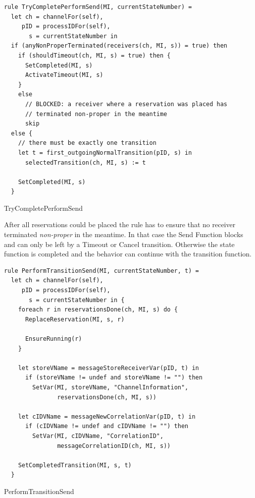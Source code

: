 \begin{listing}[htbp]
\begin{verbatim}
rule TryCompletePerformSend(MI, currentStateNumber) =
  let ch = channelFor(self),
     pID = processIDFor(self),
       s = currentStateNumber in
  if (anyNonProperTerminated(receivers(ch, MI, s)) = true) then
    if (shouldTimeout(ch, MI, s) = true) then {
      SetCompleted(MI, s)
      ActivateTimeout(MI, s)
    }
    else
      // BLOCKED: a receiver where a reservation was placed has
      // terminated non-proper in the meantime
      skip
  else {
    // there must be exactly one transition
    let t = first_outgoingNormalTransition(pID, s) in
      selectedTransition(ch, MI, s) := t

    SetCompleted(MI, s)
  }
\end{verbatim}
\caption{TryCompletePerformSend}
\label{lst:shortasm:TryCompletePerformSend}
\end{listing}


After all reservations could be placed the 
rule has to ensure that no receiver terminated \textit{non-proper} in the
meantime. In that case the Send Function blocks and can only be left by a
Timeout or Cancel transition. Otherwise the state function is completed and the behavior can
continue with the transition function.


\begin{listing}[htbp]
\begin{verbatim}
rule PerformTransitionSend(MI, currentStateNumber, t) =
  let ch = channelFor(self),
     pID = processIDFor(self),
       s = currentStateNumber in {
    foreach r in reservationsDone(ch, MI, s) do {
      ReplaceReservation(MI, s, r)

      EnsureRunning(r)
    }

    let storeVName = messageStoreReceiverVar(pID, t) in
      if (storeVName != undef and storeVName != "") then
        SetVar(MI, storeVName, "ChannelInformation",
               reservationsDone(ch, MI, s))

    let cIDVName = messageNewCorrelationVar(pID, t) in
      if (cIDVName != undef and cIDVName != "") then
        SetVar(MI, cIDVName, "CorrelationID",
               messageCorrelationID(ch, MI, s))

    SetCompletedTransition(MI, s, t)
  }
\end{verbatim}
\caption{PerformTransitionSend}
\label{lst:shortasm:PerformTransitionSend}
\end{listing}


